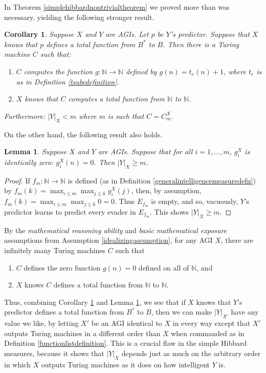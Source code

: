 \documentclass{article}
\newtheorem{corollary}[theorem]{Corollary}
\newtheorem{lemma}[theorem]{Lemma}
\begin{document}
In Theorem \ref{simplehibbardnontrivialtheorem} we proved more than was necessary,
yielding the following stronger result.

\begin{corollary}
\label{technicalcorollaryaboutsimplehibbardmeasures}
    Suppose $X$ and $Y$ are AGIs. Let $p$ be $Y$'s predictor.
    Suppose that $X$ knows that $p$ defines a total function from
    $B^*$ to $B$.
    Then there is a Turing machine $C$ such that:
    \begin{enumerate}
        \item
        $C$ computes the function $g:\mathbb N\to \mathbb N$ defined by
        $g(n)=t_e(n)+1$, where $t_e$ is as in
        Definition \ref{tsubedefinition}.
        \item
        $X$ knows that $C$ computes a total function from $\mathbb N$ to $\mathbb N$.
    \end{enumerate}
    Furthermore: $|Y|_X<m$ where $m$ is such that $C=C^X_m$.
\end{corollary}

On the other hand, the following result also holds.

\begin{lemma}
\label{technicallemmaaboutsimplehibbardmeasures}
    Suppose $X$ and $Y$ are AGIs. Suppose that for all $i=1,\ldots,m$,
    $g^X_i$ is identically zero: $g^X_i(n)=0$.
    Then $|Y|_X\geq m$.
\end{lemma}

\begin{proof}
    If $f_m:\mathbb N\to\mathbb N$
    is defined (as in Definition \ref{generalintelligencemeasuredefn})
    by $f_m(k)=\max_{i\leq m}\max_{j\leq k}g^X_i(j)$, then, by
    assumption, $f_m(k)=\max_{i\leq m}\max_{j\leq k}0=0$.
    Thus $E_{f_m}$ is empty, and so, vacuously, $Y$'s predictor learns
    to predict every evader in $E_{f_m}$. This shows $|Y|_X\geq m$.
\end{proof}

By the \emph{mathematical reasoning ability} and \emph{basic mathematical
exposure} assumptions from Assumption \ref{idealizingassumption},
for any AGI $X$, there are infinitely many Turing machines $C$ such that
\begin{enumerate}
    \item
    $C$ defines the zero function $g(n)=0$ defined on all of $\mathbb N$, and
    \item
    $X$ knows $C$ defines a total function from $\mathbb N$ to $\mathbb N$.
\end{enumerate}
Thus, combining Corollary \ref{technicalcorollaryaboutsimplehibbardmeasures}
and Lemma \ref{technicallemmaaboutsimplehibbardmeasures},
we see that if $X$ knows that $Y$'s predictor defines a total function
from $B^*$ to $B$, then we can make $|Y|_{X'}$ have any value we like,
by letting $X'$ be an AGI identical to $X$ in every way except that
$X'$ outputs Turing machines in a different order than $X$ when commanded
as in Definition \ref{functionlistdefinition}.
This is a crucial flaw in the simple Hibbard measures, because it shows
that $|Y|_X$ depends just as much on the arbitrary order in which $X$
outputs Turing machines as it does on how intelligent $Y$ is.
\end{document}
